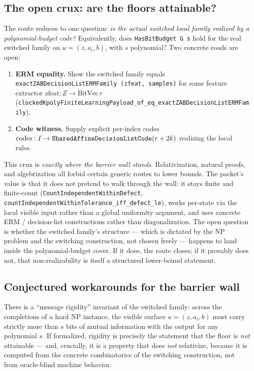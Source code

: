 \subsection{The open crux: are the floors attainable?}

The route reduces to one question: \emph{is the actual switched local family
realized by a polynomial-budget code?} Equivalently, does
\verb|HasBitBudget G s| hold for the real switched family on
$u=(z,a_i,b)$, with $s$ polynomial? Two concrete roads are open:
\begin{enumerate}\itemsep1pt
  \item \textbf{ERM equality.} Show the switched family equals
    \verb|exactZABDecisionListERMFamily (zfeat, samples)| for some feature
    extractor $\mathrm{zfeat}:Z\to\mathrm{BitVec}\,r$
    (\verb|clockedKpolyFiniteLearningPayload_of_eq_exactZABDecisionListERMFamily|).
  \item \textbf{Code witness.} Supply explicit per-index codes
    $\mathrm{codes}:I\to \verb|SharedAffineDecisionListCode|(r+2k)$ realizing
    the local rules.
\end{enumerate}
This crux is \emph{exactly where the barrier wall stands}. Relativization,
natural proofs, and algebrization all forbid certain generic routes to
lower bounds. The packet's value is that it does not pretend to walk through the
wall: it stays finite and finite-count
(\verb|CountIndependentWithinDefect|,
\verb|countIndependentWithinTolerance_iff_defect_le|), works per-state via the
local visible input rather than a global uniformity argument, and uses concrete
ERM / decision-list constructions rather than diagonalization. The open question
is whether the switched family's structure --- which is dictated by the NP
problem and the switching construction, not chosen freely --- happens to land
inside the polynomial-budget cover. If it does, the route closes; if it
provably does not, that non-realizability is itself a structured lower-bound
statement.

\subsection{Conjectured workarounds for the barrier wall}

\begin{conjecture}
\label{conj:pnp-rigidity}
There is a ``message rigidity'' invariant of the switched family: across the
completions of a hard NP instance, the visible surface $u=(z,a_i,b)$ must carry
strictly more than $s$ bits of mutual information with the output for any
polynomial $s$. If formalized, rigidity is precisely the statement that the
floor is \emph{not} attainable --- and, crucially, it is a property that does
\emph{not} relativize, because it is computed from the concrete combinatorics of
the switching construction, not from oracle-blind machine behavior.
\end{conjecture}

